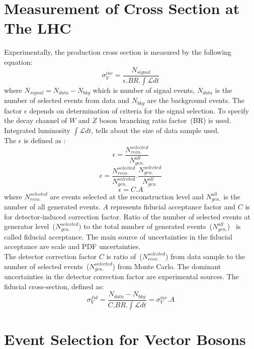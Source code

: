 \section{Measurement of Cross Section at The LHC}
Experimentally, the production cross section is measured by the following equation:
\begin{equation}
\sigma_{V}^{inc}=\frac{N_{signal}}{\epsilon.BR.\int \mathcal{L}dt}
\end{equation}
where $N_{signal}=N_{data}-N_{bkg}$ which is number of signal events, $N_{data}$ is the number of selected events from data and $N_{bkg}$ are the background events. The factor $\epsilon$ depends on determination of criteria for the signal selection. To specify the decay channel of $W$ and $Z$ boson branching ratio factor~(BR) is used. Integrated luminosity $\int \mathcal{L}dt$, tells about the size of data sample used.\\
The $\epsilon$ is defined as :
\begin{equation}
\epsilon=\frac{N_{reco.}^{selected}}{N_{gen.}^{all}}
\end{equation}
\begin{equation}
\epsilon=\frac{N_{reco.}^{selected}}{N_{gen.}^{selected}}.\frac{N_{gen.}^{selected}}{N_{gen.}^{all}}
\end{equation}
\begin{equation}
\epsilon=C.A
\end{equation}
where $N_{reco.}^{selected}$ are events selected at the reconstruction level and $N_{gen.}^{all}$ is the number of all generated events. $A$ represents fiducial acceptance factor and $C$ is for detector-induced correction factor. Ratio of the number of selected events at generator level~($N_{gen.}^{selected})$ to the total number of generated events~($N_{gen.}^{all}$)~ is called fiducial acceptance. The main source of uncertainties in the fiducial acceptance are scale and PDF uncertainties.\\
The detector correction factor $C$ is ratio of~($N_{reco.}^{selected}$) from data sample to the number of selected events~($N_{gen.}^{selected}$) from Monte Carlo. The dominant uncertainties in the detector correction factor are experimental sources.
The fiducial cross-section, defined as:
\begin{equation}
\sigma_{V}^{fid}=\frac{N_{data}-N_{bkg}}{C.BR.\int \mathcal{L}dt}=\sigma_{V}^{inc}.A
\end{equation}  
\section{Event Selection for Vector Bosons}
